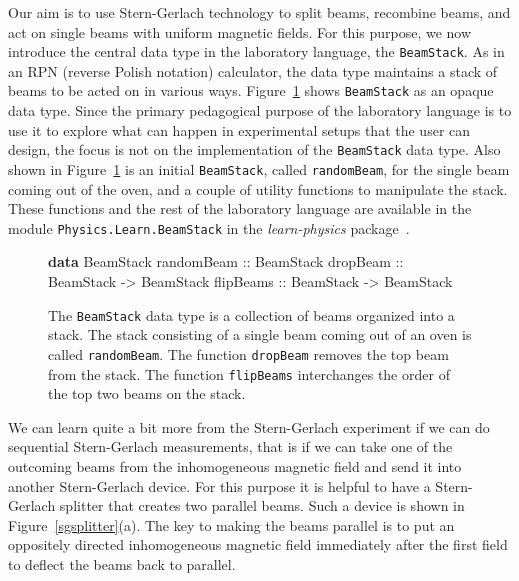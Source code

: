\documentclass[12pt]{article}
\newcommand{\KeywordTok}[1]{\textcolor[rgb]{0.00,0.44,0.13}{\textbf{{#1}}}}
\newcommand{\DataTypeTok}[1]{\textcolor[rgb]{0.56,0.13,0.00}{{#1}}}
\newcommand{\SpecialCharTok}[1]{\textcolor[rgb]{0.25,0.44,0.63}{{#1}}}
\newcommand{\FunctionTok}[1]{\textcolor[rgb]{0.02,0.16,0.49}{{#1}}}
\begin{document}
Our aim is to use Stern-Gerlach technology to split beams, recombine beams,
and act on single beams with uniform magnetic fields.
For this purpose, we now introduce the central data type in the laboratory
language, the \DataTypeTok{\texttt{BeamStack}}.
As in an RPN (reverse Polish notation) calculator, the data type maintains
a stack of beams to be acted on in various ways.
Figure~\ref{expapicore} shows \DataTypeTok{\texttt{BeamStack}} as
an opaque data type.  Since the primary pedagogical purpose of the laboratory
language is to use it to explore what can happen in experimental setups
that the user can design, the focus is not on the implementation
of the \DataTypeTok{\texttt{BeamStack}} data type.
Also shown in Figure~\ref{expapicore} is an initial \DataTypeTok{\texttt{BeamStack}},
called \FunctionTok{\texttt{randomBeam}},
for the single beam coming out of the oven, and a couple of utility
functions to manipulate the stack.
These functions and the rest of the laboratory language
are available in the module \texttt{Physics.Learn.BeamStack} in the \emph{learn-physics}
package~\cite{learn-physics}.

\begin{figure}
\begin{Highlighting}[]
\KeywordTok{data} \DataTypeTok{BeamStack}
\FunctionTok{randomBeam} \SpecialCharTok{::} \DataTypeTok{BeamStack}
\FunctionTok{dropBeam}   \SpecialCharTok{::} \DataTypeTok{BeamStack} \SpecialCharTok{->} \DataTypeTok{BeamStack}
\FunctionTok{flipBeams}  \SpecialCharTok{::} \DataTypeTok{BeamStack} \SpecialCharTok{->} \DataTypeTok{BeamStack}
\end{Highlighting}
\caption{The \DataTypeTok{\texttt{BeamStack}} data type is a collection of beams
  organized into a stack.  The stack consisting of a single beam coming out of an oven
  is called \FunctionTok{\texttt{randomBeam}}.
  The function \FunctionTok{\texttt{dropBeam}} removes the top beam from the stack.
  The function \FunctionTok{\texttt{flipBeams}} interchanges the order of the top two beams
  on the stack.
}
\label{expapicore}
\end{figure}

We can learn quite a bit more from the Stern-Gerlach experiment
if we can do sequential Stern-Gerlach measurements, that is if we can take
one of the outcoming beams from the inhomogeneous magnetic field
and send it into another Stern-Gerlach device.  For this purpose
it is helpful to have a Stern-Gerlach splitter that creates two
parallel beams.  Such a device is shown in Figure~\ref{sgsplitter}(a).
The key to making the beams parallel is to put an oppositely
directed inhomogeneous magnetic field immediately after the
first field to deflect the beams back to parallel.
\end{document}
